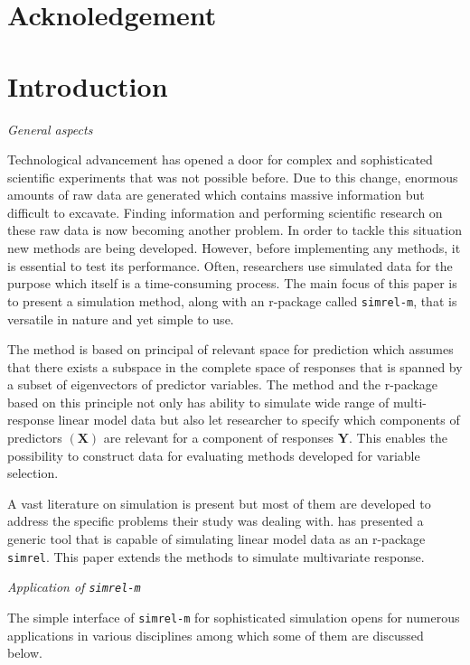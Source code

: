 \documentclass[12pt,a4paperpaper,authoryear]{elsarticle} %
\begin{document}
\section{Acknoledgement}\label{acknoledgement}

\section{Introduction}\label{introduction}

\emph{General aspects}

Technological advancement has opened a door for complex and
sophisticated scientific experiments that was not possible before. Due
to this change, enormous amounts of raw data are generated which
contains massive information but difficult to excavate. Finding
information and performing scientific research on these raw data is now
becoming another problem. In order to tackle this situation new methods
are being developed. However, before implementing any methods, it is
essential to test its performance. Often, researchers use simulated data
for the purpose which itself is a time-consuming process. The main focus
of this paper is to present a simulation method, along with an r-package
called \texttt{simrel-m}, that is versatile in nature and yet simple to
use.

The method is based on principal of relevant space for prediction which
assumes that there exists a subspace in the complete space of responses
that is spanned by a subset of eigenvectors of predictor variables. The
method and the r-package based on this principle not only has ability to
simulate wide range of multi-response linear model data but also let
researcher to specify which components of predictors \((\mathbf{X})\)
are relevant for a component of responses \(\mathbf{Y}\). This enables
the possibility to construct data for evaluating methods developed for
variable selection.

A vast literature on simulation is present but most of them are
developed to address the specific problems their study was dealing with.
\citet{saebo2015simrel} has presented a generic tool that is capable of
simulating linear model data as an r-package \texttt{simrel}. This paper
extends the methods to simulate multivariate response.

\emph{Application of \texttt{simrel-m}}

The simple interface of \texttt{simrel-m} for sophisticated simulation
opens for numerous applications in various disciplines among which some
of them are discussed below.
\end{document}
